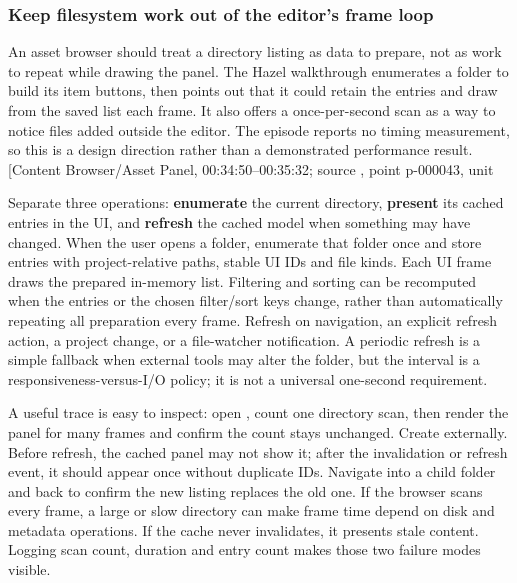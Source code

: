 \subsubsection{Keep filesystem work out of the editor's frame loop}\label{06-engine-ii-ch027-keep-filesystem-work-out-of-the-editors-frame-loop}

\hypertarget{06-engine-ii-ch027-keep-filesystem-work-out-of-the-editors-frame-loop}{}

An asset browser should treat a directory listing as data to prepare, not as work to repeat while drawing the panel. The Hazel walkthrough enumerates a folder to build its item buttons, then points out that it could retain the entries and draw from the saved list each frame. It also offers a once-per-second scan as a way to notice files added outside the editor. The episode reports no timing measurement, so this is a design direction rather than a demonstrated performance result. {[}Content Browser/Asset Panel, 00:34:50--00:35:32; source , point p-000043, unit \BookInlineCode{{u}{-}{7}{c}{a}{c}{d}{d}{0}{5}{2}{6}{5}{b}{a}{9}{9}{3}{7}{0}{7}{a}{f}{b}{3}{9}}{u-7cacdd05265ba993707afb39}{]}

Separate three operations: \textbf{enumerate} the current directory, \textbf{present} its cached entries in the UI, and \textbf{refresh} the cached model when something may have changed. When the user opens a folder, enumerate that folder once and store entries with project-relative paths, stable UI IDs and file kinds. Each UI frame draws the prepared in-memory list. Filtering and sorting can be recomputed when the entries or the chosen filter/sort keys change, rather than automatically repeating all preparation every frame. Refresh on navigation, an explicit refresh action, a project change, or a file-watcher notification. A periodic refresh is a simple fallback when external tools may alter the folder, but the interval is a responsiveness-versus-I/O policy; it is not a universal one-second requirement.

A useful trace is easy to inspect: open , count one directory scan, then render the panel for many frames and confirm the count stays unchanged. Create  externally. Before refresh, the cached panel may not show it; after the invalidation or refresh event, it should appear once without duplicate IDs. Navigate into a child folder and back to confirm the new listing replaces the old one. If the browser scans every frame, a large or slow directory can make frame time depend on disk and metadata operations. If the cache never invalidates, it presents stale content. Logging scan count, duration and entry count makes those two failure modes visible.

